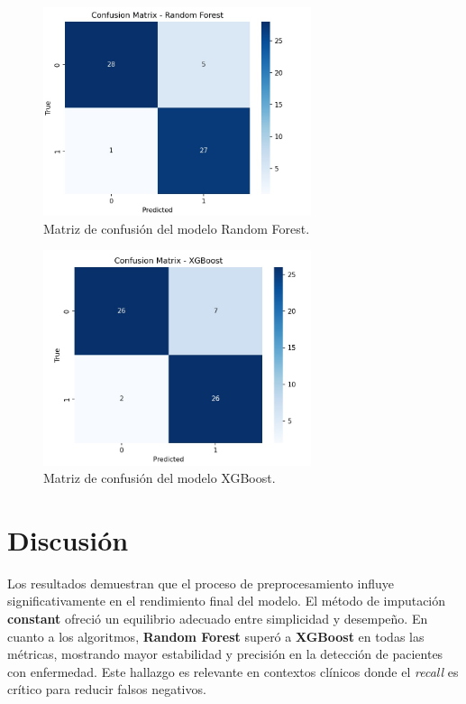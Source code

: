 \documentclass[12pt]{article}
\begin{document}
\begin{figure}[H]
\centering
\includegraphics[width=0.7\textwidth]{figures/random_forest_confusion.png}
\caption{Matriz de confusión del modelo Random Forest.}
\label{fig:rf-cm}
\end{figure}

\begin{figure}[H]
\centering
\includegraphics[width=0.7\textwidth]{figures/xgboost_confusion.png}
\caption{Matriz de confusión del modelo XGBoost.}
\label{fig:xgb-cm}
\end{figure}

\section{Discusión}
Los resultados demuestran que el proceso de preprocesamiento influye significativamente en el rendimiento final del modelo.  
El método de imputación \textbf{constant} ofreció un equilibrio adecuado entre simplicidad y desempeño.  
En cuanto a los algoritmos, \textbf{Random Forest} superó a \textbf{XGBoost} en todas las métricas, mostrando mayor estabilidad y precisión en la detección de pacientes con enfermedad.  
Este hallazgo es relevante en contextos clínicos donde el \textit{recall} es crítico para reducir falsos negativos.
\end{document}
